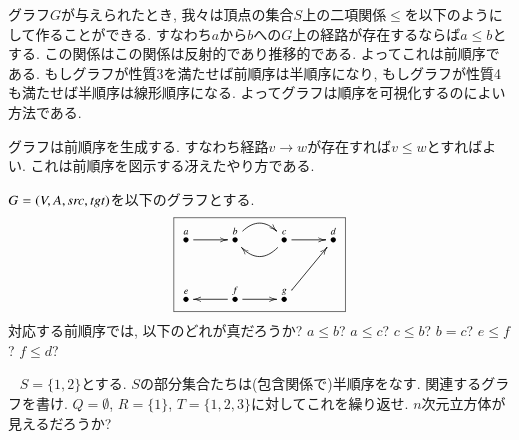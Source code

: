 \begin{remark}

グラフ$G$が与えられたとき, 我々は頂点の集合$S$上の二項関係$\leq$を以下のようにして作ることができる. すなわち$a$から$b$への$G$上の経路が存在するならば$a\leq b$とする. この関係はこの関係は反射的であり推移的である. よってこれは前順序である. もしグラフが性質3を満たせば前順序は半順序になり, もしグラフが性質4も満たせば半順序は線形順序になる. よってグラフは順序を可視化するのによい方法である.

\end{remark}

\begin{slogan}
グラフは前順序を生成する. すなわち経路$v\to w$が存在すれば$v\leq w$とすればよい. これは前順序を図示する冴えたやり方である.
\end{slogan}


\begin{exercise}
$G=(V,A,\operatorname{\mathit{src}},\operatorname{\mathit{tgt}})$を以下のグラフとする.
$$\fbox{\xymatrix{
\LMO{a}\ar[r]&\LMO{b}\ar@/^1pc/[r]&\LMO{c}\ar@/^1pc/[l]\ar[r]&\LMO{d}\\
\LMO{e}&\LMO{f}\ar[l]\ar[r]&\LMO{g}\ar[ur]}}
$$
対応する前順序では, 以下のどれが真だろうか?
\sexc $a\leq b$?
\next $a\leq c$?
\next $c\leq b$?
\next $b=c$?
\next $e\leq f$?
\next $f\leq d$?
\endsexc
\end{exercise}

\begin{exercise}\label{exc:power poset}~
\sexc $S=\{1,2\}$とする. $S$の部分集合たちは(包含関係で)半順序をなす. 関連するグラフを書け.
\next $Q=\emptyset$, $R=\{1\}$, $T=\{1,2,3\}$に対してこれを繰り返せ.
\next $n$次元立方体が見えるだろうか?
\endsexc
\end{exercise}


